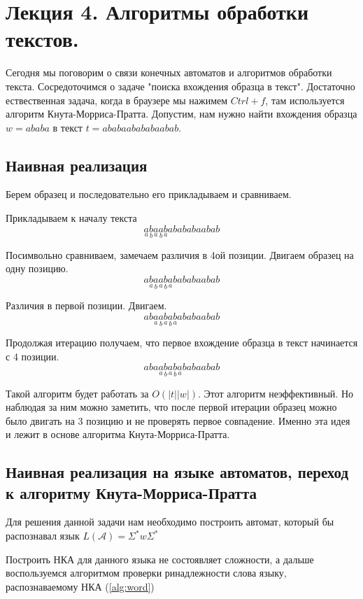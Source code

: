 \section{Лекция 4. Алгоритмы обработки текстов.}
Сегодня мы поговорим о связи конечных автоматов и алгоритмов обработки текста. Сосредоточимся о задаче "поиска вхождения образца в текст". Достаточно ествественная задача, когда в браузере мы нажимем $Ctrl + f $, там используется алгоритм Кнута-Морриса-Пратта. Допустим, нам нужно найти вхождения образца $w = ababa$ в текст $t = ababaabababaabab$.


\subsection{Наивная реализация}
Берем образец и последовательно его прикладываем и сравниваем.

Прикладываем к началу текста 
$$\underset{a}{a}\underset{b}{b}\underset{a}{a}\underset{b}{a}\underset{a}{b}abababaabab  $$

Посимвольно сравниваем, замечаем различия в 4ой позиции. Двигаем образец на одну позицию.
$$a\underset{a}{b}\underset{b}{a}\underset{a}{a}\underset{b}{b}\underset{a}{a}bababaabab  $$

Различия в первой позиции. Двигаем.
$$ab\underset{a}{a}\underset{b}{a}\underset{a}{b}\underset{b}{a}\underset{a}{b}ababaabab  $$

Продолжая итерацию получаем, что первое вхождение образца в текст начинается с 4 позиции.
$$aba\underset{a}{a}\underset{b}{b}\underset{a}{a}\underset{b}{b}\underset{a}{a}babaabab$$

Такой алгоритм будет работать за $O(|t||w|)$. Этот алгоритм неэффективный. Но наблюдая за ним можно заметить, что после первой итерации образец можно было двигать на 3 позицию и не проверять первое совпадение. Именно эта идея и лежит в основе алгоритма Кнута-Морриса-Пратта.

\subsection{Наивная реализация на языке автоматов, переход к алгоритму Кнута-Морриса-Пратта}
Для решения данной задачи нам необходимо построить автомат, который бы распознавал язык $L(\mathcal{A})=\Sigma^*w\Sigma^*$

Построить НКА для данного языка не состоявляет сложности, а дальше воспользуемся алгоритмом проверки ринадлежности слова языку, распознаваемому НКА (\ref{alg:word})


